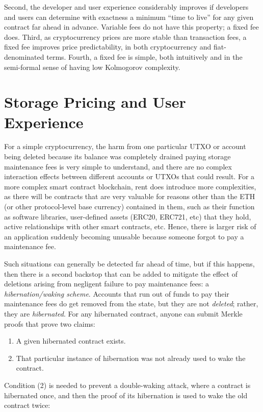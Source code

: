 \documentclass[12pt, final]{article}
\begin{document}
Second, the developer and user experience considerably improves if developers and users can determine with exactness a minimum ``time to live'' for any given contract far ahead in advance. Variable fees do not have this property; a fixed fee does. Third, as cryptocurrency prices are more stable than transaction fees, a fixed fee improves price predictability, in both cryptocurrency and fiat-denominated terms. Fourth, a fixed fee is simple, both intuitively and in the semi-formal sense of having low Kolmogorov complexity.

\section{Storage Pricing and User Experience}

For a simple cryptocurrency, the harm from one particular UTXO or account being deleted because its balance was completely drained paying storage maintenance fees is very simple to understand, and there are no complex interaction effects between different accounts or UTXOs that could result. For a more complex smart contract blockchain, rent does introduce more complexities, as there will be contracts that are very valuable for reasons other than the ETH (or other protocol-level base currency) contained in them, such as their function as software libraries, user-defined assets (ERC20, ERC721, etc) that they hold, active relationships with other smart contracts, etc. Hence, there is larger risk of an application suddenly becoming unusable because someone forgot to pay a maintenance fee. 

Such situations can generally be detected far ahead of time, but if this happens, then there is a second backstop that can be added to mitigate the effect of deletions arising from negligent failure to pay maintenance fees: a \emph{hibernation/waking scheme}. Accounts that run out of funds to pay their maintenance fees do get removed from the state, but they are not \emph{deleted}; rather, they are \emph{hibernated}. For any hibernated contract, anyone can submit Merkle proofs that prove two claims:

\begin{enumerate}
\item A given hibernated contract exists.
\item That particular instance of hibernation was not already used to wake the contract.
\end{enumerate}

Condition (2) is needed to prevent a double-waking attack, where a contract is hibernated once, and then the proof of its hibernation is used to wake the old contract twice:
\end{document}
